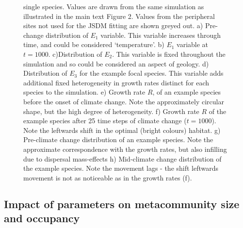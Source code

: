 \documentclass[
]{article}
\begin{document}
\begin{figure}
{single species. Values are drawn from the same simulation as illustrated
in the main text Figure 2. Values from the peripheral sites not used for
the JSDM fitting are shown greyed out. a) Pre-change distribution of
\(E_1\) variable. This variable increases through time, and could be
considered `temperature'. b) \(E_1\) variable at \(t=1000\).
c)Distribution of \(E_2\). This variable is fixed throughout the
simulation and so could be considered an aspect of geology. d)
Distribution of \(E_3\) for the example focal species. This variable
adds additional fixed heterogeneity in growth rates distinct for each
species to the simulation. e) Growth rate \(R\), of an example species
before the onset of climate change. Note the approximately circular
shape, but the high degree of heterogeneity. f) Growth rate \(R\) of the
example species after 25 time steps of climate change (\(t=1000\)). Note
the leftwards shift in the optimal (bright colours) habitat. g)
Pre-climate change distribution of an example species. Note the
approximate correspondence with the growth rates, but also infilling due
to dispersal mass-effects h) Mid-climate change distribution of the
example species. Note the movement lags - the shift leftwards movement
is not as noticeable as in the growth rates (f).}
\end{figure}

\hypertarget{impact-of-parameters-on-metacommunity-size-and-occupancy}{%
\subsection{Impact of parameters on metacommunity size and
occupancy}\label{impact-of-parameters-on-metacommunity-size-and-occupancy}}
\end{document}
